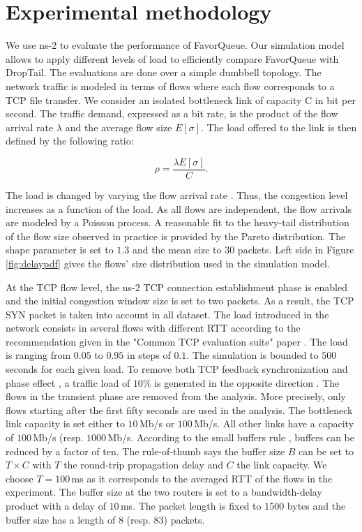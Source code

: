 \documentclass{elsart}
\begin{document}
\section{Experimental methodology}
\label{sec:exp}

We use ns-2 to evaluate the performance of FavorQueue. Our simulation model allows to apply different levels of load to efficiently compare FavorQueue with DropTail. The evaluations are done over a simple dumbbell topology. The network traffic is modeled in terms of flows where each flow corresponds to a TCP file transfer. We consider an isolated bottleneck link of capacity C in bit per second. The traffic demand, expressed as a bit rate, is the product of the flow arrival rate $\lambda$ and the average flow size $E[\sigma]$. The load offered to the link is then defined by the following ratio:

\begin{equation}
\label{eq:rho}
\rho = \frac{\lambda E[\sigma]}{C}\textrm{.}
\end{equation}

The load is changed by varying the flow arrival rate \cite{Lachlan2008}. Thus, the congestion level increases as a function of the load. As all flows are independent, the flow arrivals are modeled by a Poisson process. 
A reasonable fit to the heavy-tail distribution of the flow size observed in practice is provided by the Pareto distribution. The shape parameter is set to $1.3$ and the mean size to 30 packets. 
Left side in Figure \ref{fig:delaypdf} gives the flows' size distribution used in the simulation model.

At the TCP flow level, the ns-2 TCP connection establishment phase is enabled and the initial congestion window size is set to two packets. As a result, the TCP SYN packet is taken into account in all dataset.
The load introduced in the network consists in several flows with different RTT according to the recommendation given in the "Common TCP evaluation suite" paper \cite{Lachlan2008}. The load is ranging from $0.05$ to $0.95$ in steps of $0.1$. The simulation is bounded to $500$ seconds for each given load. To remove both TCP feedback synchronization and phase effect \cite{Lachlan2008}, a traffic load of $10\%$ is generated in the opposite direction \cite{Lachlan2008}. The flows in the transient phase are removed from the analysis. More precisely, only flows starting after the first fifty seconds are used in the analysis. 
The bottleneck link capacity is set either to $10$\,Mb/s or $100$\,Mb/s. All other links have a capacity of $100$\,Mb/s (resp. $1000$\,Mb/s. According to the small buffers rule \cite{Ganjali06}, buffers can be reduced by a factor of ten. The rule-of-thumb says the buffer size $B$ can be set to $T \times C$ with $T$ the round-trip propagation delay and $C$ the link capacity. We choose $T=100$\,ms as it corresponds to the averaged RTT of the flows in the experiment. The buffer size at the two routers is set to a bandwidth-delay product with a delay of $10$\,ms. The packet length is fixed to $1500$ bytes and the buffer size has a length of 8 (resp. 83) packets. 
\end{document}

